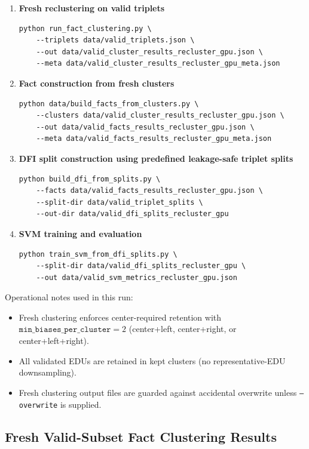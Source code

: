 \documentclass[12pt,a4paper]{article}
\begin{document}
\begin{enumerate}
\item \textbf{Fresh reclustering on valid triplets}
\begin{verbatim}
python run_fact_clustering.py \
	--triplets data/valid_triplets.json \
	--out data/valid_cluster_results_recluster_gpu.json \
	--meta data/valid_cluster_results_recluster_gpu_meta.json
\end{verbatim}

\item \textbf{Fact construction from fresh clusters}
\begin{verbatim}
python data/build_facts_from_clusters.py \
	--clusters data/valid_cluster_results_recluster_gpu.json \
	--out data/valid_facts_results_recluster_gpu.json \
	--meta data/valid_facts_results_recluster_gpu_meta.json
\end{verbatim}

\item \textbf{DFI split construction using predefined leakage-safe triplet splits}
\begin{verbatim}
python build_dfi_from_splits.py \
	--facts data/valid_facts_results_recluster_gpu.json \
	--split-dir data/valid_triplet_splits \
	--out-dir data/valid_dfi_splits_recluster_gpu
\end{verbatim}

\item \textbf{SVM training and evaluation}
\begin{verbatim}
python train_svm_from_dfi_splits.py \
	--split-dir data/valid_dfi_splits_recluster_gpu \
	--out data/valid_svm_metrics_recluster_gpu.json
\end{verbatim}
\end{enumerate}

Operational notes used in this run:
\begin{itemize}
\item Fresh clustering enforces center-required retention with \(\texttt{min\_biases\_per\_cluster}=2\)
			(center+left, center+right, or center+left+right).
\item All validated EDUs are retained in kept clusters (no representative-EDU downsampling).
\item Fresh clustering output files are guarded against accidental overwrite unless \texttt{--overwrite} is supplied.
\end{itemize}

\subsection{Fresh Valid-Subset Fact Clustering Results}
\end{document}
